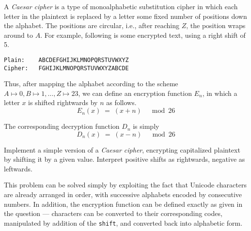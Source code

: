 

\problem A {\em Caesar cipher} is a type of monoalphabetic substitution cipher in which each letter
in the plaintext is replaced by a letter some fixed number of positions down the alphabet. The positions
are circular, i.e., after reaching $Z$, the position wraps around to $A$. For example, following is some encrypted
text, using a right shift of 5.

\begin{lstlisting}[numbers=none, xleftmargin=.25\textwidth, xrightmargin=.2\textwidth]
Plain:    ABCDEFGHIJKLMNOPQRSTUVWXYZ
Cipher:   FGHIJKLMNOPQRSTUVWXYZABCDE
\end{lstlisting}

Thus, after mapping the alphabet according to the scheme $A\mapsto 0, B\mapsto 1,\dots,Z\mapsto 23$, we can define
an encryption function $E_n$, in which a letter $x$ is shifted rightwards by $n$ as follows.
\begin{equation*}
	E_n(x)	\;=\;	(x + n)	\quad\bmod 26
\end{equation*}

The corresponding decryption function $D_n$ is simply
\begin{equation*}
	D_n(x)	\;=\;	(x - n)	\quad\bmod 26
\end{equation*}

Implement a simple version of a {\em Caesar cipher}, encrypting capitalized plaintext by shifting it by a given value.
Interpret positive shifts as rightwards, negative as leftwards.

\solution This problem can be solved simply by exploiting the fact that Unicode characters are already arranged in order, with successive alphabets encoded by consecutive numbers. In addition, the encryption function can be defined exactly as given in the question --- characters can be converted to their corresponding codes, manipulated by addition of the {\tt shift}, and converted back into alphabetic form.

\sourcecode
